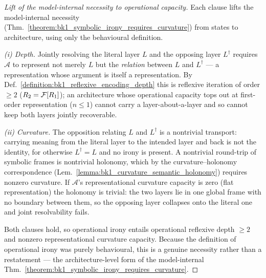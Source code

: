 \begin{proof}[Lift of the model-internal necessity to operational capacity]
\label{proof:bk1_operational_irony_requires_reflexive_curvature}
\leavevmode
Each clause lifts the model-internal necessity
(Thm.~\ref{theorem:bk1_symbolic_irony_requires_curvature}) from states to
architecture, using only the behavioural definition.

\emph{(i) Depth.} Jointly resolving the literal layer $L$ and the opposing layer
$L^{\dagger}$ requires $\mathcal{A}$ to represent not merely $L$ but the
\emph{relation} between $L$ and $L^{\dagger}$ --- a representation whose argument
is itself a representation. By Def.~\ref{definition:bk1_reflexive_encoding_depth}
this is reflexive iteration of order $\ge2$ ($R_2=\mathcal{F}[R_1]$);
an architecture whose operational capacity tops out at first-order representation
($n\le1$) cannot carry a layer-about-a-layer and so cannot keep both layers
jointly recoverable.

\emph{(ii) Curvature.} The opposition relating $L$ and $L^{\dagger}$ is a
nontrivial transport: carrying meaning from the literal layer to the intended
layer and back is not the identity, for otherwise $L^{\dagger}=L$ and no irony is
present. A nontrivial round-trip of symbolic frames is nontrivial holonomy, which
by the curvature--holonomy correspondence
(Lem.~\ref{lemma:bk1_curvature_semantic_holonomy}) requires nonzero curvature. If
$\mathcal{A}$'s representational curvature capacity is zero (flat representation)
the holonomy is trivial: the two layers lie in one global frame with no boundary
between them, so the opposing layer collapses onto the literal one and joint
resolvability fails.

Both clauses hold, so operational irony entails operational reflexive depth
$\ge2$ and nonzero representational curvature capacity. Because the definition of
operational irony was purely behavioural, this is a genuine necessity rather than
a restatement --- the architecture-level form of the model-internal
Thm.~\ref{theorem:bk1_symbolic_irony_requires_curvature}.
\end{proof}

